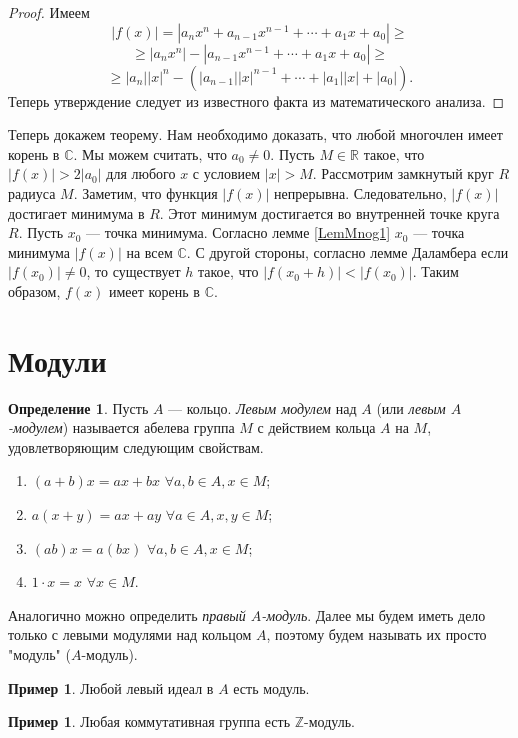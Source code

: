 \documentclass[12pt, titlepage, oneside]{amsbook}
\newcommand{\ZZ}{\mathbb{Z}}
\newcommand{\RR}{\mathbb{R}}
\newcommand{\CC}{\mathbb{C}}
\theoremstyle{definition}
\newtheorem{example}[theorem]{Пример}
\newtheorem{definition}[theorem]{Определение}
\theoremstyle{remark}
\begin{document}
\begin{proof}
	Имеем $$|f(x)|=|a_nx^n+a_{n-1}x^{n-1}+\cdots+a_1x+a_0|\geq$$ $$\geq|a_nx^n|-|a_{n-1}x^{n-1}+\cdots+a_1x+a_0|\geq$$ $$\geq|a_n| |x|^n-(|a_{n-1}||x|^{n-1}+\cdots+|a_1||x|+|a_0|).$$ Теперь утверждение следует из известного факта из математического анализа.
\end{proof}

Теперь докажем теорему. Нам необходимо доказать, что любой многочлен имеет корень в $\CC$. Мы можем считать, что $a_0\neq 0$. Пусть $M\in\RR$ такое, что $|f(x)|>2|a_0|$ для любого $x$ с условием $|x|>M$. Рассмотрим замкнутый круг $R$ радиуса $M$. Заметим, что функция $|f(x)|$ непрерывна. Следовательно, $|f(x)|$ достигает минимума в $R$. Этот минимум достигается во внутренней точке круга $R$. Пусть $x_0$ --- точка минимума. Согласно лемме \ref{LemMnog1} $x_0$ --- точка минимума $|f(x)|$ на всем $\CC$. С другой стороны, согласно лемме Даламбера если $|f(x_0)|\neq 0$, то существует $h$ такое, что $|f(x_0+h)|<|f(x_0)|$. Таким образом, $f(x)$ имеет корень в $\CC$.

\section{Модули}

\begin{definition}
	Пусть $A$ --- кольцо. \emph{Левым модулем} над $A$ (или \emph{левым $A$-модулем}) называется абелева группа $M$ с действием кольца $A$ на $M$, удовлетворяющим следующим свойствам.
	\begin{enumerate}
		\item $(a+b)x=ax+bx$ $\forall a,b\in A, x\in M$;
		\item $a(x+y)=ax+ay$ $\forall a\in A, x,y\in M$;
		\item $(ab)x=a(bx)$ $\forall a,b\in A, x\in M$;
		\item $1\cdot x=x$ $\forall x\in M$.
	\end{enumerate}
\end{definition}

Аналогично можно определить \emph{правый $A$-модуль}. Далее мы будем иметь дело только с левыми модулями над кольцом $A$, поэтому будем называть их просто "модуль" ($A$-модуль).

\begin{example}
	Любой левый идеал в $A$ есть модуль.
\end{example}

\begin{example}
	Любая коммутативная группа есть $\ZZ$-модуль.
\end{example}
\end{document}
